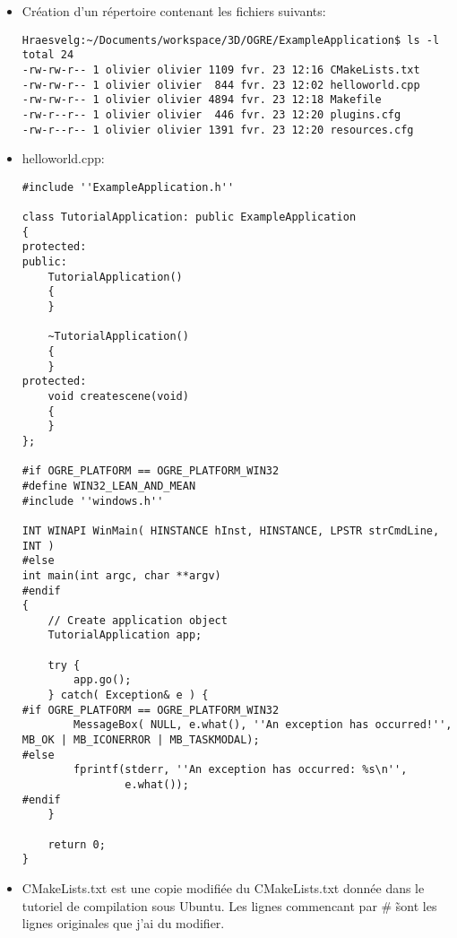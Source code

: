 \begin{itemize}
\item Création d'un répertoire contenant les fichiers suivants:

\begin{lstlisting}
Hraesvelg:~/Documents/workspace/3D/OGRE/ExampleApplication$ ls -l
total 24
-rw-rw-r-- 1 olivier olivier 1109 fvr. 23 12:16 CMakeLists.txt
-rw-rw-r-- 1 olivier olivier  844 fvr. 23 12:02 helloworld.cpp
-rw-rw-r-- 1 olivier olivier 4894 fvr. 23 12:18 Makefile
-rw-r--r-- 1 olivier olivier  446 fvr. 23 12:20 plugins.cfg
-rw-r--r-- 1 olivier olivier 1391 fvr. 23 12:20 resources.cfg
\end{lstlisting}

\item helloworld.cpp:

\begin{lstlisting}
#include ''ExampleApplication.h''
 
class TutorialApplication: public ExampleApplication
{
protected:
public:
    TutorialApplication()
    {
    }
 
    ~TutorialApplication()
    {
    }
protected:
    void createscene(void)
    {
    }
};
 
#if OGRE_PLATFORM == OGRE_PLATFORM_WIN32
#define WIN32_LEAN_AND_MEAN
#include ''windows.h''
 
INT WINAPI WinMain( HINSTANCE hInst, HINSTANCE, LPSTR strCmdLine, INT )
#else
int main(int argc, char **argv)
#endif
{
    // Create application object
    TutorialApplication app;
 
    try {
        app.go();
    } catch( Exception& e ) {
#if OGRE_PLATFORM == OGRE_PLATFORM_WIN32
        MessageBox( NULL, e.what(), ''An exception has occurred!'', MB_OK | MB_ICONERROR | MB_TASKMODAL);
#else
        fprintf(stderr, ''An exception has occurred: %s\n'',
                e.what());
#endif
    }
 
    return 0;
}
\end{lstlisting}


\item CMakeLists.txt est une copie modifiée du CMakeLists.txt donnée dans le tutoriel de compilation sous Ubuntu. Les lignes commencant par \# \~ sont les lignes originales que j'ai du modifier.
\end{itemize}



